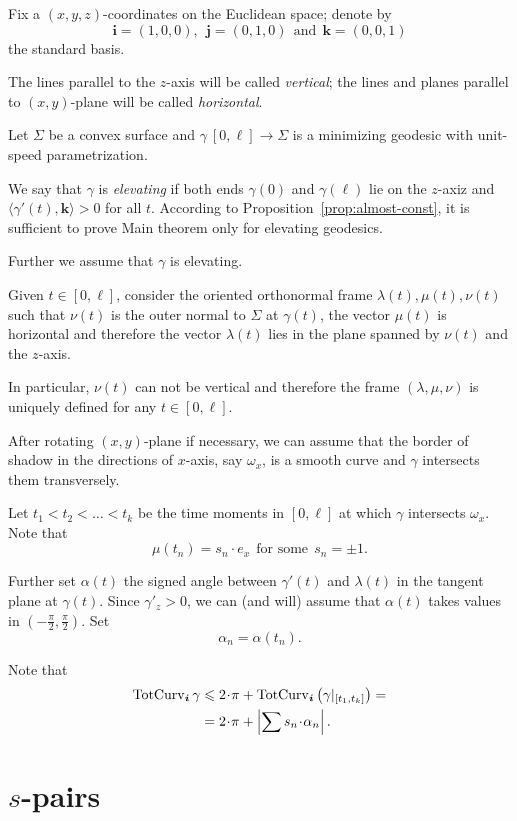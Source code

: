 \documentclass[a4paper,10pt]{amsart}
\begin{document}
Fix a $(x,y,z)$-coordinates on the Euclidean space;
denote by 
\[\bm{i}=(1,0,0),\ \ \bm{j}=(0,1,0)\ \ \text{and}\ \ \bm{k}=(0,0,1)\]
the standard basis.

The lines parallel to the $z$-axis will be called \emph{vertical};
the lines and planes parallel to $(x,y)$-plane will be called \emph{horizontal}.

Let $\Sigma$ be a convex surface 
and $\gamma\:[0,\ell]\to \Sigma$ is a minimizing geodesic 
with unit-speed parametrization.

We say that $\gamma$ is \emph{elevating} if both ends $\gamma(0)$ and $\gamma(\ell)$ lie on the $z$-axiz and $\langle\gamma'(t),\bm{k}\rangle>0$ for all $t$.
According to Proposition~\ref{prop:almost-const}, it is sufficient to prove 
Main theorem only for elevating geodesics.

Further we assume that $\gamma$ is elevating.

Given $t\in [0,\ell]$, 
consider the oriented orthonormal frame $\lambda(t),\mu(t),\nu(t)$ 
such that $\nu(t)$ is the outer normal to $\Sigma$ at $\gamma(t)$,
the vector $\mu(t)$ is horizontal and therefore the vector $\lambda(t)$ lies in the plane spanned by $\nu(t)$ and the $z$-axis.

In particular, $\nu(t)$ can not be vertical 
and therefore the frame $(\lambda,\mu,\nu)$ is uniquely defined for any $t\in[0,\ell]$.

After rotating $(x,y)$-plane if necessary, 
we can assume that the border of shadow in the directions of $x$-axis, say $\omega_x$, 
is a smooth curve and $\gamma$ intersects them transversely.

Let $t_1<t_2<\dots<t_k$ be the time moments in $[0,\ell]$ 
at which $\gamma$ intersects $\omega_x$.
Note that 
\[\mu(t_n)=s_n\cdot e_x\ \ \text{for some}\ \  s_n=\pm1.\]

Further set $\alpha(t)$ the signed angle between $\gamma'(t)$ and $\lambda(t)$ in the tangent plane at $\gamma(t)$.
Since $\gamma'_z>0$,
we can (and will) 
assume that $\alpha(t)$ takes values in $(-\tfrac\pi2,\tfrac\pi2)$.
Set 
\[\alpha_n=\alpha(t_n).\]

Note that  
\begin{align*}
\tc_{\bm{i}} \gamma
&\le 
2\cdot\pi+\tc_{\bm{i}}\left(\gamma|_{[t_1,t_k]}\right)=
\\
&=2\cdot\pi+\left|\sum s_n\cdot \alpha_n\right|.
\end{align*}

\section{$s$-pairs}
\end{document}
